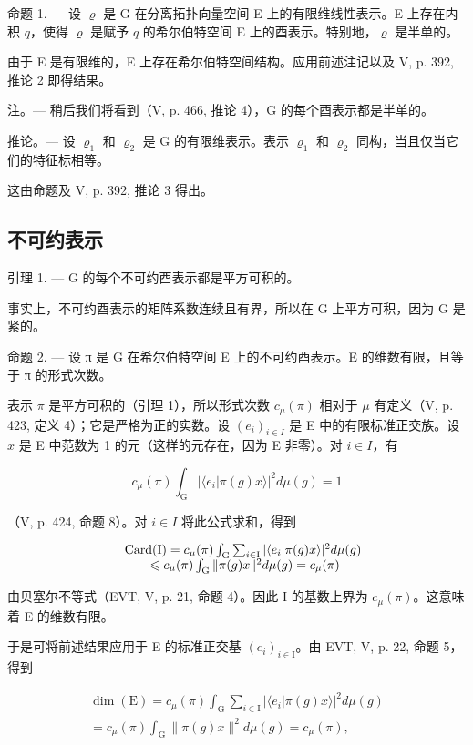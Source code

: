 命题 1. --- 设 \(\varrho\) 是 G 在分离拓扑向量空间 E 上的有限维线性表示。E 上存在内积 \(q\)，使得 \(\varrho\) 是赋予 \(q\) 的希尔伯特空间 E 上的酉表示。特别地，\(\varrho\) 是半单的。

由于 E 是有限维的，E 上存在希尔伯特空间结构。应用前述注记以及 V, p. 392, 推论 2 即得结果。

注。--- 稍后我们将看到（V, p. 466, 推论 4），G 的每个酉表示都是半单的。

推论。--- 设 \(\varrho_{1}\) 和 \(\varrho_{2}\) 是 G 的有限维表示。表示 \(\varrho_{1}\) 和 \(\varrho_{2}\) 同构，当且仅当它们的特征标相等。

这由命题及 V, p. 392, 推论 3 得出。

\subsection{不可约表示}

引理 1. --- G 的每个不可约酉表示都是平方可积的。

事实上，不可约酉表示的矩阵系数连续且有界，所以在 G 上平方可积，因为 G 是紧的。

命题 2. --- 设 π 是 G 在希尔伯特空间 E 上的不可约酉表示。E 的维数有限，且等于 π 的形式次数。

表示 \(\pi\) 是平方可积的（引理 1），所以形式次数 \(c_{\mu}(\pi)\) 相对于 \(\mu\) 有定义（V, p. 423, 定义 4）；它是严格为正的实数。设 \((e_i)_{i \in I}\) 是 E 中的有限标准正交族。设 \(x\) 是 E 中范数为 1 的元（这样的元存在，因为 E 非零）。对 \(i \in I\)，有

\[
c _ {\mu} (\pi) \int_ {\mathrm{G}} | \langle e _ {i} | \pi (g) x \rangle | ^ {2} d \mu (g) = 1
\]

（V, p. 424, 命题 8）。对 \(i \in I\) 将此公式求和，得到

\[
\begin{array}{r l} & {\mathrm{Card(I)} = c _ {\mu} (\pi) \int_ {\mathrm{G}} \sum_ {i \in \mathrm{I}} | \langle e _ {i} | \pi (g) x \rangle | ^ {2} d \mu (g)} \\ & {\qquad \leqslant c _ {\mu} (\pi) \int_ {\mathrm{G}} \| \pi (g) x \| ^ {2} d \mu (g) = c _ {\mu} (\pi)} \end{array}
\]

由贝塞尔不等式（EVT, V, p. 21, 命题 4）。因此 I 的基数上界为 \(c_{\mu}(\pi)\)。这意味着 E 的维数有限。

于是可将前述结果应用于 E 的标准正交基 \((e_{i})_{i\in\mathrm{I}}\)。由 EVT, V, p. 22, 命题 5，得到

\[
\begin{array}{r} \dim (\mathrm{E}) = c _ {\mu} (\pi) \int_ {\mathrm{G}} \sum_ {i \in \mathrm{I}} | \langle e _ {i} | \pi (g) x \rangle | ^ {2} d \mu (g) \\ = c _ {\mu} (\pi) \int_ {\mathrm{G}} \| \pi (g) x \| ^ {2} d \mu (g) = c _ {\mu} (\pi), \end{array}
\]


